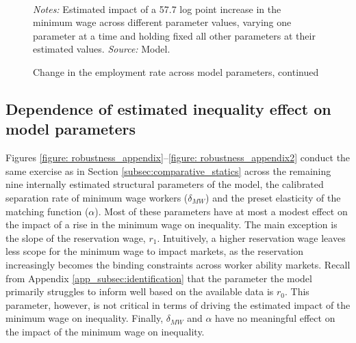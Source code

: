 \begin{figure}[!htb]
  \centering
  \caption{Change in the employment rate across model parameters, continued\label{figure: robustness_appendix5}}
  \prefigvspace
  \hspace*{\fill}%
  \hspace*{\fill}
  \\
  \postfigvspace
  \begin{minipage}[t]{1\columnwidth}%
    \begin{spacing}{0.75}
      \emph{\scriptsize{}Notes: }{\scriptsize{}Estimated impact of a 57.7 log point increase in the minimum wage across different parameter values, varying one parameter at a time and holding fixed all other parameters at their estimated values.
      \emph{\scriptsize{}Source: } Model.}
    \end{spacing}
  \end{minipage}
\end{figure}




\clearpage
\subsection{Dependence of estimated inequality effect on model parameters\label{app_subsec:effects_dependence_on_parameters}}

Figures \ref{figure: robustness_appendix}--\ref{figure: robustness_appendix2} conduct the same exercise as in Section \ref{subsec:comparative_statics} across the remaining nine internally estimated structural parameters of the model, the calibrated separation rate of minimum wage workers ($\delta_{MW}$) and the preset elasticity of the matching function ($\alpha$). Most of these parameters have at most a modest effect on the impact of a rise in the minimum wage on inequality. The main exception is the slope of the reservation wage, $r_1$. Intuitively, a higher reservation wage leaves less scope for the minimum wage to impact markets, as the reservation increasingly becomes the binding constraints across worker ability markets. Recall from Appendix \ref{app_subsec:identification} that the parameter the model primarily struggles to inform well based on the available data is $r_0$. This parameter, however, is not critical in terms of driving the estimated impact of the minimum wage on inequality. Finally, $\delta_{MW}$ and $\alpha$ have no meaningful effect on the impact of the minimum wage on inequality.

